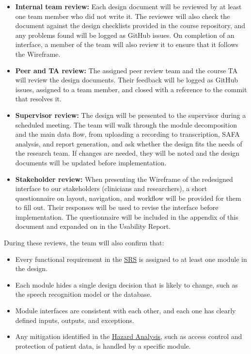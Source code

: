\documentclass[12pt, titlepage]{article}
\newcommand{\SRSLink}{\href{https://github.com/Nour-Fawaz/MacaBoca/blob/main/pdfs/SRS/SRS.pdf}{SRS}}
\newcommand{\HALink}{\href{https://github.com/Nour-Fawaz/MacaBoca/blob/main/pdfs/HazardAnalysis/HazardAnalysis.pdf}{Hazard Analysis}}
\renewcommand{\_}{\oldunderscore\allowbreak}
\begin{document}
\begin{itemize}
  \item \textbf{Internal team review:} Each design document will be reviewed
  by at least one team member who did not write it. The reviewer will also check
  the document against the design checklists provided in the course
  repository, and any problems found will be logged as GitHub issues.
  On completion of an interface, a member of the team will also review it to
  ensure that it follows the Wireframe.
  \item \textbf{Peer and TA review:} The assigned peer review team and the
  course TA will review the design documents. Their feedback will be logged
  as GitHub issues, assigned to a team member, and closed with a reference to
  the commit that resolves it.
  \item \textbf{Supervisor review:} The design will be presented to the
  supervisor during a scheduled meeting. The team will walk through the
  module decomposition and the main data flow, from uploading a recording to
  transcription, SAFA analysis, and report generation, and ask whether the
  design fits the needs of the research team. If changes are needed, they will
  be noted and the design documents will be updated before implementation.
  \item \textbf{Stakeholder review:} When presenting the Wireframe of the redesigned
  interface to our stakeholders (clinicians and researchers), a short questionnaire on 
  layout, navigation, and workflow will be provided for them to fill out. 
  Their responses will be used to revise the interface before implementation. 
  The questionnaire will be included in the appendix of this document and 
  expanded on in the Usability Report.
\end{itemize}

During these reviews, the team will also confirm that:

\begin{itemize}
  \item Every functional requirement in the \SRSLink{} is assigned to at least
  one module in the design.
  \item Each module hides a single design decision that is likely to change,
  such as the speech recognition model or the database.
  \item Module interfaces are consistent with each other,
  and each one has clearly defined inputs, outputs, and exceptions.
  \item Any mitigation identified in the \HALink{}, such as access control
  and protection of patient data, is handled by a specific module.
\end{itemize}
\end{document}
